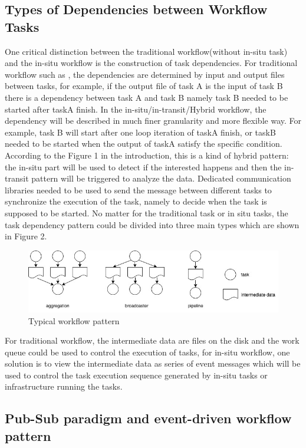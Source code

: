 \subsection{Types of Dependencies between Workflow Tasks}
One critical distinction between the traditional workflow(without in-situ task) and the in-situ workflow is the construction of task dependencies. For traditional workflow such as \cite{albrecht2012makeflow}, the dependencies are determined by input and output files between tasks, for example, if the output file of task A is the input of task B there is a dependency between task A and task B namely task B needed to be started after taskA finish.  In the in-situ/in-transit/Hybrid workflow, the dependency will be described in much finer granularity and more flexible way.  For example, task B will start after one loop iteration of taskA finish, or taskB needed to be started when the output of taskA satisfy the specific condition. According to the Figure 1 in the introduction, this is a kind of hybrid pattern: the in-situ part will be used to detect if the interested happens and then the in-transit pattern will be triggered to analyze the data. Dedicated communication libraries needed to be used to send the message between different tasks to synchronize the execution of the task, namely to decide when the task is supposed to be started. No matter for the traditional task or in situ tasks, the task dependency pattern could be divided into three main types \cite{albrecht2012makeflow,bharathi2008characterization} which are shown in Figure 2. 
\begin{figure} 
\centering
\includegraphics[width=.8\linewidth]{./figure/taskpattern.jpg}
\caption{Typical workflow pattern}
 \label{fg:state}
\end{figure} 

For traditional workflow, the intermediate data are files on the disk and the work queue\cite{albrecht2012makeflow} could be used to control the execution of tasks,  for in-situ workflow, one solution is to view the intermediate data as series of event messages which will be used to control the task execution sequence generated by in-situ tasks or infrastructure running the tasks.

\subsection{Pub-Sub paradigm and event-driven workflow pattern}

